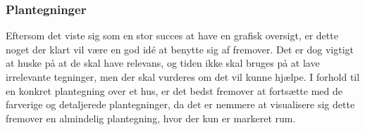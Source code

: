 \subsubsection{Plantegninger}
Eftersom det viste sig som en stor succes at have en grafisk oversigt, er dette noget der klart vil være en god idé at benytte sig af fremover. Det er dog vigtigt at huske på at de skal have relevans, og tiden ikke skal bruges på at lave irrelevante tegninger, men der skal vurderes om det vil kunne hjælpe. I forhold til en konkret plantegning over et hus, er det bedst fremover at fortsætte med de farverige og detaljerede plantegninger, da det er nemmere at visualisere sig dette fremover en almindelig plantegning, hvor der kun er markeret rum.







